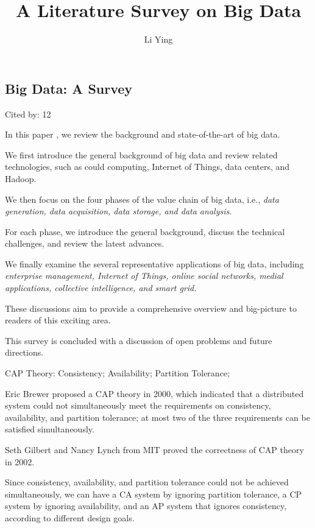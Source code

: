 \documentclass[a4paper,11pt]{article}
\author{Li Ying}
\title{A Literature Survey on Big Data}
\begin{document}
\maketitle


\subsection*{Big Data: A Survey}
{\color{cyan} {\color{magenta} Cited by: 12}

In this paper \cite{bdsurvey}, 
we review the background and state-of-the-art of big data. 

We first introduce the general background of big data and review related technologies,
such as could computing, Internet of Things, data centers, and Hadoop. 

We then focus on the four phases of the value chain of big data, i.e., 
{\color{red} \em data generation, data acquisition, data storage, and data analysis}. 

For each phase, we 
introduce the general background, 
discuss the technical challenges, and 
review the latest advances. 

We finally examine the several representative applications of big data, 
including
{\color{red} \em 
enterprise management, 
Internet of Things, 
online social networks, 
medial applications, 
collective intelligence, and 
smart grid.
}

These discussions aim to provide a 
comprehensive overview and big-picture 
to readers of this exciting area. 

This survey is concluded with a discussion of 
open problems and future directions.

}

{
CAP Theory: Consistency; Availability; Partition Tolerance;

Eric Brewer proposed a CAP theory \cite{captheory} in 2000, 
which indicated that a distributed system could not simultaneously
meet the requirements on consistency, availability, and partition tolerance; 
at most two of the three requirements can be satisfied simultaneously. 

Seth Gilbert and Nancy Lynch from MIT proved the correctness of CAP theory \cite{capproof} in 2002. 

Since consistency, availability, and partition tolerance could not be achieved simultaneously, 
we can have 
a CA system by ignoring partition tolerance, 
a CP system by ignoring availability, and 
an AP system that ignores consistency,
according to different design goals. 

}


\end{document}
